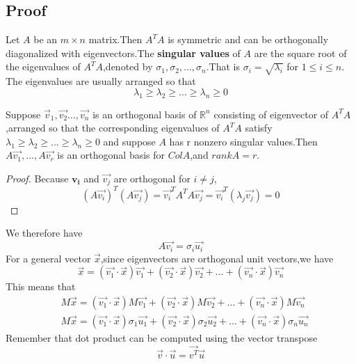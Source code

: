 \subsection{Proof}
Let $A$ be an $m\times n$ matrix.Then $A^TA$ is symmetric and can be orthogonally diagonalized with eigenvectors.The \textbf{singular values} of $A$ are the square root of the eigenvalues of $A^TA$,denoted by $\sigma_1,\sigma_2,...,\sigma_n$.That is $\sigma_i = \sqrt{\lambda_i}$ for $1\leq i \leq n$.
The eigenvalues are usually arranged so that
\begin{equation}
\lambda_1 \geq \lambda_2 \geq...\geq \lambda_n \geq 0
\end{equation}

\begin{theorem}
	Suppose {$\vec{v}_1,\vec{v_2}...,\vec{v_n}$} is an orthogonal basis of $\mathbb{R}^n$ consisting of eigenvector of $A^TA$,arranged so that the corresponding eigenvalues of  $A^TA$ satisfy $\lambda_1 \geq \lambda_2 \geq...\geq \lambda_n \geq 0$  and suppose $A$ has r nonzero singular values.Then {$A\vec{v_1},...,A\vec{v_r}$} is an orthogonal basis for $ColA$,and $rankA=r$. 
\end{theorem}
\begin{proof}
	Because $\mathbf{v_i}$ and $\vec{v_j}$ are orthogonal for $i\neq j$,
	\begin{equation}
	(A\vec{v_i})^T(A\vec{v_j}) = \vec{v_i}^TA^TA\vec{v_j} = \vec{v_i}^T(\lambda_j\vec{v_j})=0
	\end{equation} 
\end{proof}
We therefore have
\begin{equation}
A\vec{v_i} = \sigma_i\vec{u_i}
\end{equation}
For a general vector $\vec{x}$,since eigenvectors are orthogonal unit vectors,we have
\begin{equation}
\vec{x} = (\vec{v_1}\cdot\vec{x})\vec{v_1} + (\vec{v_2}\cdot\vec{x})\vec{v_2} +...+(\vec{v_n}\cdot\vec{x})\vec{v_n}
\end{equation}
This means that
\begin{align}
& M\vec{x} = (\vec{v_1}\cdot\vec{x})M\vec{v_1} + (\vec{v_2}\cdot\vec{x})M\vec{v_2} +...+(\vec{v_n}\cdot\vec{x})M\vec{v_n} \\
& M\vec{x} = (\vec{v_1}\cdot\vec{x})\sigma_1\vec{u_1} + (\vec{v_2}\cdot\vec{x})\sigma_2\vec{u_2} +...+(\vec{v_n}\cdot\vec{x})\sigma_n\vec{u_n}
\end{align}
Remember that dot product can be computed using the vector transpose
\begin{equation}
\vec{v}\cdot\vec{u} = \vec{v^T}\vec{u}
\end{equation}
